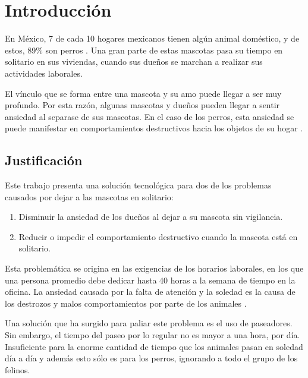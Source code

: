 \section{Introducción}

En México, 7 de cada 10 hogares mexicanos tienen algún animal doméstico, y de estos, 89\% son perros \parencite{inegi2016}. Una gran parte de estas mascotas pasa su tiempo en solitario en sus viviendas, cuando sus dueños se marchan a realizar sus actividades laborales.

El vínculo que se forma entre una mascota y su amo puede llegar a ser muy profundo. Por esta razón, algunas mascotas y dueños pueden llegar a sentir ansiedad al separase de sus mascotas. En el caso de los perros, esta ansiedad se puede manifestar en comportamientos destructivos hacia los objetos de su hogar \parencite{parthasarathy2006}. 


\subsection{Justificación}
\label{sec:justificacion}

Este trabajo presenta una solución tecnológica para dos de los problemas causados por dejar a las mascotas en solitario:

\begin{enumerate}
  \item Disminuir la ansiedad de los dueños al dejar a su mascota sin vigilancia.
  \item Reducir o impedir el comportamiento destructivo cuando la mascota está en solitario. 
\end{enumerate}

Esta problemática se origina en las exigencias de los horarios laborales, en los que una persona promedio debe dedicar hasta 40 horas a la
semana de tiempo en la oficina. La ansiedad causada por la falta de atención y la soledad es la causa de los destrozos y malos comportamientos por parte de los animales \parencite{ibanes2022}.

Una solución que ha surgido para paliar este problema es el uso de paseadores. Sin embargo, el tiempo del paseo por lo regular no es mayor a una hora, por día. Insuficiente para la enorme cantidad de tiempo que los animales pasan en soledad día a día y además esto sólo es para los perros, ignorando a todo el grupo de los felinos.


